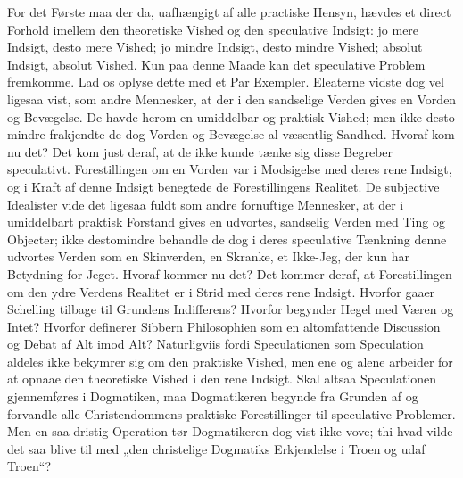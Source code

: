 For det Første maa der da, uafhængigt af alle practiske Hensyn,
hævdes et direct Forhold imellem den theoretiske Vished og den
speculative Indsigt: jo mere Indsigt, desto mere Vished; jo mindre
Indsigt, desto mindre Vished; absolut Indsigt, absolut Vished. Kun
paa denne Maade kan det speculative Problem fremkomme. Lad os
oplyse dette med et Par Exempler. Eleaterne vidste dog vel ligesaa
vist, som andre Mennesker, at der i den sandselige Verden gives en
Vorden og Bevægelse. De havde herom en umiddelbar og praktisk
Vished; men ikke desto mindre frakjendte de dog Vorden og
Bevægelse al væsentlig Sandhed. Hvoraf kom nu det? Det kom just
deraf, at de ikke kunde tænke sig disse Begreber speculativt.
Forestillingen om en Vorden var
 i Modsigelse med deres rene Indsigt, og i Kraft af denne Indsigt
benegtede de Forestillingens Realitet. De subjective Idealister
vide det ligesaa fuldt som andre fornuftige Mennesker, at der i
umiddelbart praktisk Forstand gives en udvortes, sandselig Verden
med Ting og Objecter; ikke destomindre behandle de dog i deres
speculative Tænkning denne udvortes Verden som en Skinverden, en
Skranke, et Ikke-Jeg, der kun har Betydning for Jeget. Hvoraf
kommer nu det? Det kommer deraf, at Forestillingen om den ydre
Verdens Realitet er i Strid med deres rene Indsigt. Hvorfor gaaer
Schelling tilbage til Grundens Indifferens? Hvorfor begynder Hegel
med Væren og Intet? Hvorfor definerer Sibbern Philosophien som en
altomfattende Discussion og Debat af Alt imod Alt? Naturligviis
fordi Speculationen som Speculation aldeles ikke bekymrer sig om
den praktiske Vished, men ene og alene arbeider for at opnaae den
theoretiske Vished i den rene Indsigt. Skal altsaa Speculationen
gjennemføres i Dogmatiken, maa Dogmatikeren begynde fra Grunden af
og forvandle alle Christendommens praktiske Forestillinger til
speculative Problemer. Men en saa dristig Operation tør
Dogmatikeren dog vist ikke vove; thi hvad vilde det saa blive til
med „den christelige Dogmatiks Erkjendelse i Troen og udaf
Troen“?

